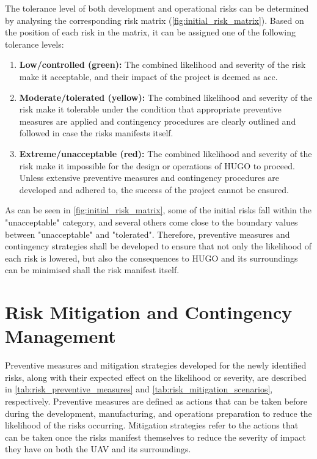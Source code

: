 The tolerance level of both development and operational risks can be determined by analysing the corresponding risk matrix (\autoref{fig:initial_risk_matrix}). Based on the position of each risk in the matrix, it can be assigned one of the following tolerance levels:
\begin{enumerate}
    \item \textbf{Low/controlled (green):} The combined likelihood and severity of the risk make it acceptable, and their impact of the project is deemed as acc.
    \item \textbf{Moderate/tolerated (yellow): } The combined likelihood and severity of the risk make it tolerable under the condition that appropriate preventive measures are applied and contingency procedures are clearly outlined and followed in case the risks manifests itself.
    \item \textbf{Extreme/unacceptable (red): } The combined likelihood and severity of the risk make it impossible for the design or operations of HUGO to proceed. Unless extensive preventive measures and contingency procedures are developed and adhered to, the success of the project cannot be ensured.
\end{enumerate}

As can be seen in \autoref{fig:initial_risk_matrix}, some of the initial risks fall within the "unacceptable" category, and several others come close to the boundary values between "unacceptable" and "tolerated". Therefore, preventive measures and contingency strategies shall be developed to ensure that not only the likelihood of each risk is lowered, but also the consequences to HUGO and its surroundings can be minimised shall the risk manifest itself.











\section{Risk Mitigation and Contingency Management}
\label{sec:risk_mitigation_contingency_management}

Preventive measures and mitigation strategies developed for the newly identified risks, along with their expected effect on the likelihood or severity, are described in \autoref{tab:risk_preventive_measures} and \autoref{tab:risk_mitigation_scenarios}, respectively. Preventive measures are defined as actions that can be taken before during the development, manufacturing, and operations preparation to reduce the likelihood of the risks occurring. Mitigation strategies refer to the actions that can be taken once the risks manifest themselves to reduce the severity of impact they have on both the UAV and its surroundings.

